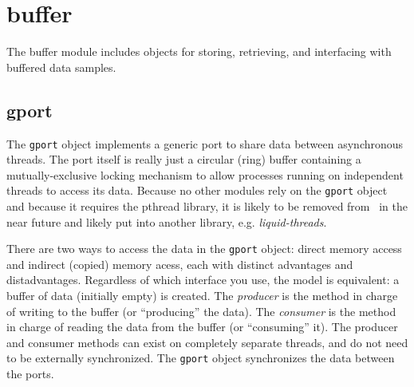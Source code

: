 % 
%

\newpage
\section{buffer}
\label{module:buffer}
The buffer module includes objects for storing, retrieving, and interfacing
with buffered data samples.

%
%
\subsection{gport}
\label{module:buffer:gport}
The {\tt gport} object implements a generic port to share data between
asynchronous threads.
The port itself is really just a circular (ring) buffer containing a
mutually-exclusive locking mechanism to allow processes running on independent
threads to access its data.
Because no other modules rely on the {\tt gport} object and because it
requires the pthread library, it is likely to be removed from \liquid\ in the
near future and likely put into another library, e.g. {\em liquid-threads}.

There are two ways to access the data in the {\tt gport} object: direct memory
access and indirect (copied) memory acess, each with distinct advantages and
distadvantages.
Regardless of which interface you use, the model is equivalent:
a buffer of data (initially empty) is created.
The {\it producer} is the method in charge of writing to the buffer (or
``producing'' the data).
The {\it consumer} is the method in charge of reading the data from the buffer
(or ``consuming'' it).
The producer and consumer methods can exist on completely separate threads,
and do not need to be externally synchronized.
The {\tt gport} object synchronizes the data between the ports.

